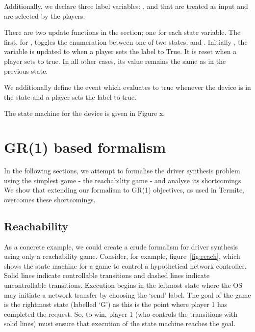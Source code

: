 Additionally, we declare three label variables: ,  and  that are treated as input and are selected by the players.

There are two update functions in the  section; one for each state variable. The first, for , toggles the enumeration between one of two states:  and . Initially , the variable is updated to  when a player sets the label  to True. It is reset when a player sets  to true. In all other cases, its value remains the same as in the previous state.

We additionally define the  event which evaluates to true whenever the device is in the  state and a player sets the  label to true.

The state machine for the device is given in Figure x. 

\section{GR(1) based formalism}

In the following sections, we attempt to formalise the driver synthesis problem using the simplest game - the reachability game - and analyse its shortcomings. We show that extending our formalism to GR(1) objectives, as used in Termite, overcomes these shortcomings.

\subsection{Reachability}

As a concrete example, we could create a crude formalism for driver synthesis using only a reachability game. Consider, for example, figure~\ref{fig:reach}, which shows the state machine for a game to control a hypothetical network controller. Solid lines indicate controllable transitions and dashed lines indicate uncontrollable transitions. Execution begins in the leftmost state where the OS may initiate a network transfer by choosing the `send' label. The goal of the game is the rightmost state (labelled `G') as this is the point where player 1 has completed the request. So, to win, player 1 (who controls the transitions with solid lines) must ensure that execution of the state machine reaches the goal. 

